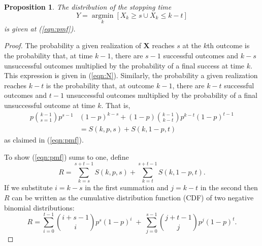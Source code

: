 \documentclass[12pt]{article}
\DeclareMathOperator*{\argmin}{argmin}
\newcommand*{\argminl}{\argmin\limits}
\newtheorem{prop}{Proposition}
\begin{document}
\begin{prop}
The distribution of the stopping time
\begin{equation*}
Y = \argminl_k \left[X_k \geq s \cup X_k \leq k-t \right]
\end{equation*}
is given at (\ref{eqn:pmf}).
\end{prop}
\begin{proof}

The probability a given realization of $\mathbf{X}$ reaches $s$ at
the $k$th outcome is the probability that, at time $k-1$, there are $s-1$
successful outcomes and $k-s$ unsuccessful outcomes multiplied by
the probability of a final success at time $k$. This expression is given
in (\ref{eqn:N}). 
Similarly, the probability a given realization reaches $k-t$
is the probability that, at outcome $k-1$, there are $k-t$ successful outcomes
and $t-1$ unsuccessful outcomes multiplied by the probability of a final
unsuccessful outcome at time $k$. That is,
\begin{align*}
p {k-1 \choose s=1} p^{s-1} & (1-p)^{k-s} + (1-p) {k-1 \choose k-t} p^{k-t} (1-p)^{t-1} \\ 
& = S(k, p, s) + S(k, 1-p, t)
\end{align*}
as claimed in (\ref{eqn:pmf}).


To show (\ref{eqn:pmf}) sums to one, define
\begin{equation*} 
R = \sum_{k=s}^{s+t-1} S(k, p, s) + \sum_{k=t}^{s+t-1} S(k, 1-p, t).
\end{equation*}
If we substitute $i=k-s$ in the first summation and $j=k-t$ in the second then
$R$ can be written as the cumulative distribution function (CDF) of two
negative binomial distributions:
\begin{equation} \label{eqn:transformed_sum}
R = \sum_{i=0}^{t-1} {i+s-1 \choose i} p^s (1-p)^i \; + \;
\sum_{j=0}^{s-1} {j+t-1 \choose j} p^j (1-p)^t.
\end{equation}


\end{proof}
\end{document}
